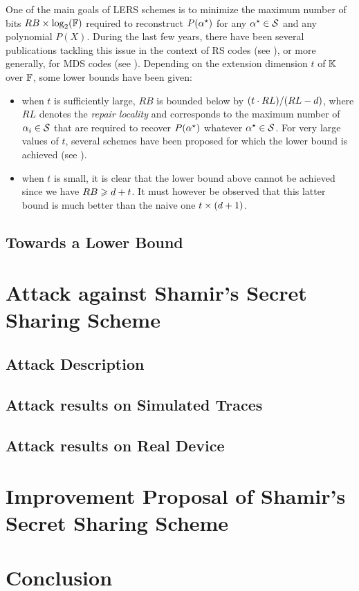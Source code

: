 \documentclass{llncs}
\begin{document}
One of the main goals of LERS schemes is to minimize the maximum number of bits $RB\times \log_2(\mathbb{F})$ required to reconstruct $P(\alpha^{\star})$ for any $\alpha^{\star}\in \mathcal{S}$ and any polynomial $P(X)$. During the last few years, there have been several publications tackling this issue in the context of RS codes (see \eg \cite{DRWS11,SPDC13}), or more generally, for MDS codes (see \eg \cite{CHJL11,DGWWR10,SR10}). Depending on the extension dimension $t$ of $\mathbb{K}$ over $\mathbb{F}$, some lower bounds have been given:
\begin{itemize}
\item when $t$ is sufficiently large, $RB$ is bounded below by $(t\cdot RL)/(RL-d)$, where $RL$ denotes the {\em repair locality} and corresponds to the maximum number of $\alpha_{i} \in \mathcal{S}$ that are required to recover $P(\alpha^{\star})$ whatever $\alpha^{\star} \in \mathcal{S}$. For very large values of $t$, several schemes have been proposed for which the lower bound is achieved (see \eg \cite{CHJL11,SR10}).
\item when $t$ is small, it is clear that the lower bound above cannot be achieved since we have $RB \geqslant d + t$. It must however be observed that this latter bound is much better than the naive one $t\times (d + 1)$. 
\end{itemize}
\subsection{Towards a Lower Bound}
 \todo{}

\section{Attack against Shamir's Secret Sharing Scheme }
\subsection{Attack Description}
 \todo{}
\subsection{Attack results on Simulated Traces}
 \todo{}
\subsection{Attack results on Real Device}
 \todo{}


\section{Improvement Proposal of Shamir's Secret Sharing Scheme}
 \todo{}

\section{Conclusion}
\label{sec-conc}
 \todo{}
 


\end{document}
